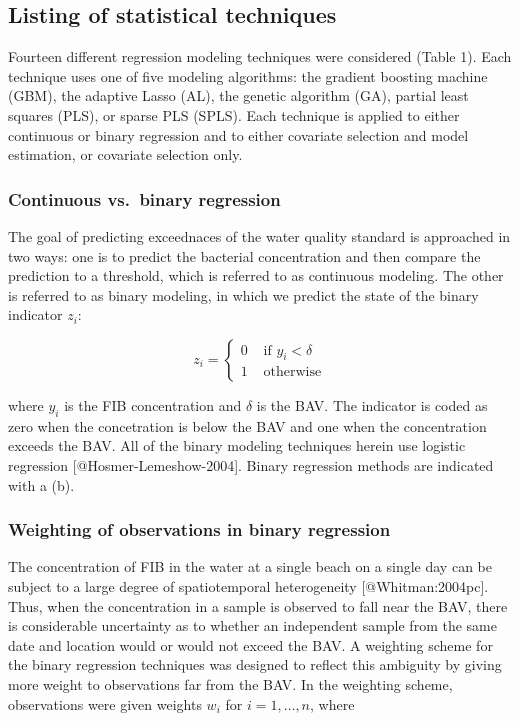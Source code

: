 \subsection{Listing of statistical
techniques}\label{listing-of-statistical-techniques}

Fourteen different regression modeling techniques were considered (Table
1). Each technique uses one of five modeling algorithms: the gradient
boosting machine (GBM), the adaptive Lasso (AL), the genetic algorithm
(GA), partial least squares (PLS), or sparse PLS (SPLS). Each technique
is applied to either continuous or binary regression and to either
covariate selection and model estimation, or covariate selection only.

\subsubsection{Continuous vs.~binary
regression}\label{continuous-vs.binary-regression}

The goal of predicting exceednaces of the water quality standard is
approached in two ways: one is to predict the bacterial concentration
and then compare the prediction to a threshold, which is referred to as
continuous modeling. The other is referred to as binary modeling, in
which we predict the state of the binary indicator \(z_{i}\):

\[ z_{i}=\left\{ \begin{array}{cl}
0 & \text{ if } y_{i} < \delta\\
1 & \text{ otherwise}
\end{array}\right. \]

where \(y_i\) is the FIB concentration and \(\delta\) is the BAV. The
indicator is coded as zero when the concetration is below the BAV and
one when the concentration exceeds the BAV. All of the binary modeling
techniques herein use logistic regression {[}@Hosmer-Lemeshow-2004{]}.
Binary regression methods are indicated with a (b).

\subsubsection{Weighting of observations in binary
regression}\label{weighting-of-observations-in-binary-regression}

The concentration of FIB in the water at a single beach on a single day
can be subject to a large degree of spatiotemporal heterogeneity
{[}@Whitman:2004pc{]}. Thus, when the concentration in a sample is
observed to fall near the BAV, there is considerable uncertainty as to
whether an independent sample from the same date and location would or
would not exceed the BAV. A weighting scheme for the binary regression
techniques was designed to reflect this ambiguity by giving more weight
to observations far from the BAV. In the weighting scheme, observations
were given weights \(w_i\) for \(i=1,\dots,n\), where

